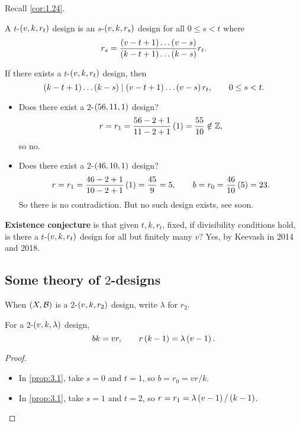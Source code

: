 Recall \ref{cor:1.24}.

\begin{proposition}
\label{prop:3.1}
A $ t $-$ \br{v, k, r_t} $ design is an $ s $-$ \br{v, k, r_s} $ design for all $ 0 \le s < t $ where
$$ r_s = \dfrac{\br{v - t + 1} \dots \br{v - s}}{\br{k - t + 1} \dots \br{k - s}}r_t. $$
\end{proposition}

\begin{corollary}
If there exists a $ t $-$ \br{v, k, r_t} $ design, then
$$ \br{k - t + 1} \dots \br{k - s} \mid \br{v - t + 1} \dots \br{v - s}r_t, \qquad 0 \le s < t. $$
\end{corollary}

\begin{example*}
\hfill
\begin{itemize}
\item Does there exist a $ 2 $-$ \br{56, 11, 1} $ design?
$$ r = r_1 = \dfrac{56 - 2 + 1}{11 - 2 + 1}\br{1} = \dfrac{55}{10} \notin \ZZ, $$
so no.
\item Does there exist a $ 2 $-$ \br{46, 10, 1} $ design?
$$ r = r_1 = \dfrac{46 - 2 + 1}{10 - 2 + 1}\br{1} = \dfrac{45}{9} = 5, \qquad b = r_0 = \dfrac{46}{10}\br{5} = 23. $$
So there is no contradiction. But no such design exists, see soon.
\end{itemize}
\end{example*}

\textbf{Existence conjecture} is that given $ t, k, r_t $, fixed, if divisibility conditions hold, is there a $ t $-$ \br{v, k, r_t} $ design for all but finitely many $ v $? Yes, by Keevash in 2014 and 2018.

\pagebreak

\subsection{Some theory of \texorpdfstring{$ 2 $}{2}-designs}

When $ \br{X, \BBB} $ is a $ 2 $-$ \br{v, k, r_2} $ design, write $ \lambda $ for $ r_2 $.

\begin{proposition}
For a $ 2 $-$ \br{v, k, \lambda} $ design,
$$ bk = vr, \qquad r\br{k - 1} = \lambda\br{v - 1}. $$
\end{proposition}

\begin{proof}
\hfill
\begin{itemize}
\item In \ref{prop:3.1}, take $ s = 0 $ and $ t = 1 $, so $ b = r_0 = vr / k $.
\item In \ref{prop:3.1}, take $ s = 1 $ and $ t = 2 $, so $ r = r_1 = \lambda\br{v - 1} / \br{k - 1} $.
\end{itemize}
\end{proof}

